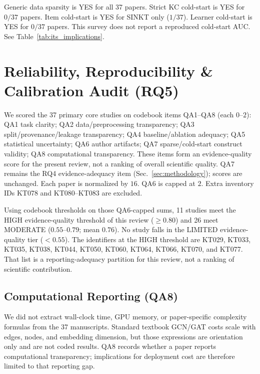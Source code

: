 \documentclass[lettersize,journal]{IEEEtran}
\begin{document}
Generic data sparsity is YES for all 37 papers. Strict KC cold-start is YES for $0/37$ papers. Item cold-start is YES for SINKT only ($1/37$). Learner cold-start is YES for $0/37$ papers. This survey does not report a reproduced cold-start AUC. See Table~\ref{tab:its_implications}.

\section{Reliability, Reproducibility \& Calibration Audit (RQ5)}
\label{sec:reliability}

We scored the 37 primary core studies on codebook items QA1--QA8 (each $0$--$2$): QA1 task clarity; QA2 data/preprocessing transparency; QA3 split/provenance/leakage transparency; QA4 baseline/ablation adequacy; QA5 statistical uncertainty; QA6 author artifacts; QA7 sparse/cold-start construct validity; QA8 computational transparency. These items form an evidence-quality score for the present review, not a ranking of overall scientific quality. QA7 remains the RQ4 evidence-adequacy item (Sec.~\ref{sec:methodology}); scores are unchanged. Each paper is normalized by $16$. QA6 is capped at $2$. Extra inventory IDs KT078 and KT080--KT083 are excluded.

Using codebook thresholds on those QA6-capped sums, 11 studies meet the HIGH evidence-quality threshold of this review ($\ge 0.80$) and 26 meet MODERATE ($0.55$--$0.79$; mean $0.76$). No study falls in the LIMITED evidence-quality tier ($< 0.55$). The identifiers at the HIGH threshold are KT029, KT033, KT035, KT038, KT044, KT050, KT060, KT064, KT066, KT070, and KT077. That list is a reporting-adequacy partition for this review, not a ranking of scientific contribution.

\subsection{Computational Reporting (QA8)}
We did not extract wall-clock time, GPU memory, or paper-specific complexity formulas from the 37 manuscripts. Standard textbook GCN/GAT costs scale with edges, nodes, and embedding dimension, but those expressions are orientation only and are not coded results. QA8 records whether a paper reports computational transparency; implications for deployment cost are therefore limited to that reporting gap.
\end{document}
